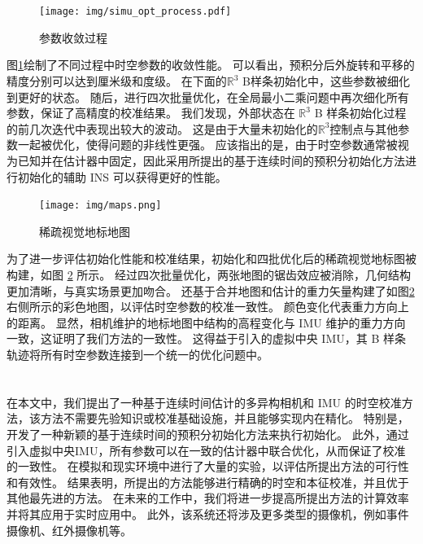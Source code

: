 \documentclass[12pt, twocolumn]{article}
\newcommand\normf{\fangsong}
\begin{document}
	\section{\normf{实验验证}}
		\begin{figure}[h]
			\centering
			\texttt{[image: img/simu\_opt\_process.pdf]}
			\caption{\normf 参数收敛过程}
			\label{fig:参数收敛过程}
		\end{figure}
	图\ref{fig:参数收敛过程}绘制了不同过程中时空参数的收敛性能。
	可以看出，预积分后外旋转和平移的精度分别可以达到厘米级和度级。
	在下面的$\mathbb{R}^3$ B样条初始化中，这些参数被细化到更好的状态。
	随后，进行四次批量优化，在全局最小二乘问题中再次细化所有参数，保证了高精度的校准结果。
	我们发现，外部状态在 $\mathbb{R}^3$ B 样条初始化过程的前几次迭代中表现出较大的波动。
	这是由于大量未初始化的$\mathbb{R}^3$控制点与其他参数一起被优化，使得问题的非线性更强。
	应该指出的是，由于时空参数通常被视为已知并在估计器中固定，因此采用所提出的基于连续时间的预积分初始化方法进行初始化的辅助 INS 可以获得更好的性能。
	
	\begin{figure}[h]
		\centering
		\texttt{[image: img/maps.png]}
		\caption{\normf 稀疏视觉地标地图}
		\label{fig:稀疏视觉地标地图}
	\end{figure}
	
	为了进一步评估初始化性能和校准结果，初始化和四批优化后的稀疏视觉地标图被构建，如图 \ref{fig:稀疏视觉地标地图} 所示。
	经过四次批量优化，两张地图的锯齿效应被消除，几何结构更加清晰，与真实场景更加吻合。
	还基于合并地图和估计的重力矢量构建了如图\ref{fig:稀疏视觉地标地图}右侧所示的彩色地图，以评估时空参数的校准一致性。
	颜色变化代表重力方向上的距离。
	显然，相机维护的地标地图中结构的高程变化与 IMU 维护的重力方向一致，这证明了我们方法的一致性。
	这得益于引入的虚拟中央 IMU，其 B 样条轨迹将所有时空参数连接到一个统一的优化问题中。

	\section{\normf{结论与展望}}
	在本文中，我们提出了一种基于连续时间估计的多异构相机和 IMU 的时空校准方法，该方法不需要先验知识或校准基础设施，并且能够实现内在精化。
	特别是，开发了一种新颖的基于连续时间的预积分初始化方法来执行初始化。
	此外，通过引入虚拟中央IMU，所有参数可以在一致的估计器中联合优化，从而保证了校准的一致性。
	在模拟和现实环境中进行了大量的实验，以评估所提出方法的可行性和有效性。
	结果表明，所提出的方法能够进行精确的时空和本征校准，并且优于其他最先进的方法。
	在未来的工作中，我们将进一步提高所提出方法的计算效率并将其应用于实时应用中。
	此外，该系统还将涉及更多类型的摄像机，例如事件摄像机、红外摄像机等。
	
\end{document}
